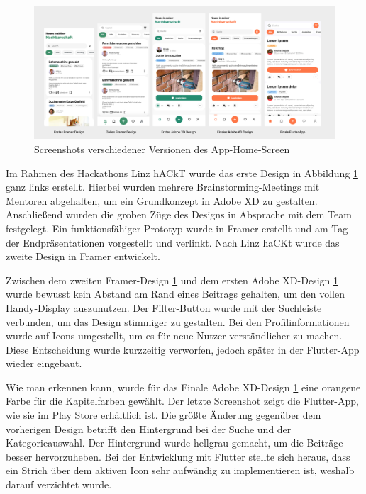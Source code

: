 \begin{figure}[h]
  \centering
  \includegraphics[width=1\textwidth]{pics/app-design-history.png}
  \caption{Screenshots verschiedener Versionen des App-Home-Screen}
  \label{fig:app-design-history}
\end{figure}
Im Rahmen des Hackathons Linz hACkT wurde das erste Design in Abbildung \ref{fig:app-design-history} ganz links erstellt. Hierbei wurden mehrere Brainstorming-Meetings mit Mentoren abgehalten, um ein Grundkonzept in Adobe XD zu gestalten. Anschließend wurden die groben Züge des Designs in Absprache mit dem Team festgelegt. Ein funktionsfähiger Prototyp wurde in Framer erstellt und am Tag der Endpräsentationen vorgestellt und verlinkt. Nach Linz haCKt wurde das zweite Design in Framer entwickelt.

Zwischen dem zweiten Framer-Design
\ref{fig:app-design-history} und dem ersten Adobe XD-Design
\ref{fig:app-design-history} wurde bewusst kein Abstand am
Rand eines Beitrags gehalten, um den vollen Handy-Display
auszunutzen. Der Filter-Button wurde mit der Suchleiste
verbunden, um das Design stimmiger zu gestalten. Bei den
Profilinformationen wurde auf Icons umgestellt, um es für
neue Nutzer verständlicher zu machen. Diese Entscheidung
wurde kurzzeitig verworfen, jedoch später in der Flutter-App
wieder eingebaut.

Wie man erkennen kann, wurde für das Finale Adobe
XD-Design \ref{fig:app-design-history} eine orangene Farbe für die Kapitelfarben
gewählt. Der letzte Screenshot zeigt die Flutter-App, wie
sie im Play Store erhältlich ist. Die größte Änderung
gegenüber dem vorherigen Design betrifft den Hintergrund
bei der Suche und der Kategorieauswahl. Der Hintergrund
wurde hellgrau gemacht, um die Beiträge besser hervorzuheben.
Bei der Entwicklung mit Flutter stellte sich heraus, dass
ein Strich über dem aktiven Icon sehr aufwändig zu
implementieren ist, weshalb darauf verzichtet wurde.




